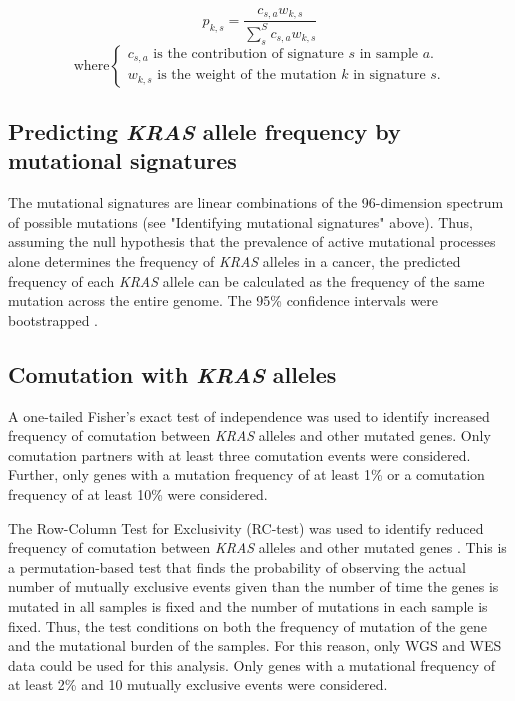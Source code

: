 \documentclass[english, 10pt, letterpaper]{article}
\newcommand{\KRAS}{\emph{KRAS}}
\begin{document}
\begin{equation}
\label{eq:kras_mutation_from_signature}
p_{k,s} = \frac{c_{s,a} w_{k,s}}{\sum_{s}^{S} c_{s,a} w_{k,s}}
\end{equation}
\begin{equation*}
    \text{where} 
    \begin{cases}
        c_{s,a} \text{ is the contribution of signature $s$ in sample $a$.} \\
        w_{k,s} \text{ is the weight of the mutation $k$ in signature $s$.}
    \end{cases}
\end{equation*}


\subsection*{Predicting \KRAS{} allele frequency by mutational signatures}

The mutational signatures are linear combinations of the 96-dimension spectrum of possible mutations (see "Identifying mutational signatures" above).
Thus, assuming the null hypothesis that the prevalence of active mutational processes alone determines the frequency of \KRAS{} alleles in a cancer, the predicted frequency of each \KRAS{} allele can be calculated as the frequency of the same mutation across the entire genome.
The 95\% confidence intervals were bootstrapped \cite{R-boot}.


\subsection*{Comutation with \KRAS{} alleles}

A one-tailed Fisher’s exact test of independence was used to identify increased frequency of comutation between \KRAS{} alleles and other mutated genes. Only comutation partners with at least three comutation events were considered. Further, only genes with a mutation frequency of at least 1\% or a comutation frequency of at least 10\% were considered. 

The Row-Column Test for Exclusivity (RC-test) was used to identify reduced frequency of comutation between \KRAS{} alleles and other mutated genes \cite{Leiserson2016}. 
This is a permutation-based test that finds the probability of observing the actual number of mutually exclusive events given than the number of time the genes is mutated in all samples is fixed and the number of mutations in each sample is fixed.
Thus, the test conditions on both the frequency of mutation of the gene and the mutational burden of the samples.
For this reason, only WGS and WES data could be used for this analysis.
Only genes with a mutational frequency of at least 2\% and 10 mutually exclusive events were considered.
\end{document}
